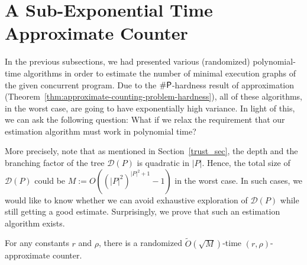 \section{A Sub-Exponential Time Approximate Counter}

In the previous subsections, we had presented various (randomized) polynomial-time algorithms in order to estimate the number of minimal execution graphs of the given concurrent program. Due to the $\#\mathsf{P}$-hardness result of approximation (Theorem~\ref{thm:approximate-counting-problem-hardness}), all
of these algorithms, in the worst case, are going to have exponentially high variance.
In light of this, we can ask the following question: 
What if we relax the requirement that our estimation algorithm must work in polynomial time? 

More precisely, note that as mentioned in Section~\ref{trust_sec}, the depth and the branching factor of the \trust tree $\mathcal{D}(P)$ is quadratic in $|P|$. Hence, the total size of $\mathcal{D}(P)$ could be $M := O((|P|^2)^{|P|^2+1} - 1)$ in the worst case. In such cases, we would like to know whether we can avoid exhaustive exploration of $\mathcal{D}(P)$ while still getting a good estimate.
Surprisingly, we prove that such an estimation algorithm exists.


\begin{theorem}
\label{th:stockmeyer}
    For any constants $r$ and $\rho$, there is a randomized $\tilde{O}(\sqrt{M})$-time $(r, \rho)$-approximate counter.
\end{theorem}

